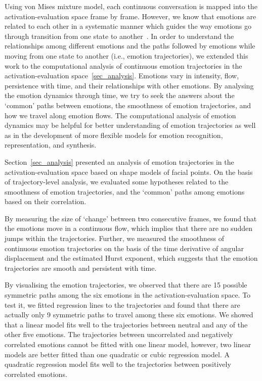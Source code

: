 \documentclass[10pt,journal,cspaper,compsoc]{IEEEtran}
\begin{document}
Using von Mises mixture model, each continuous conversation is mapped into the activation-evaluation space frame by frame. However, we know that emotions are related to each other in a systematic manner which guides the way emotions go through transition from one state to another~\cite{blumberg1991patterns}. In order to understand the relationships among different emotions and the paths followed by emotions while moving from one state to another (i.e., emotion trajectories), we extended this work to the computational analysis of continuous emotion trajectories in the activation-evaluation space~\ref{sec_analysis}. Emotions vary in intensity, flow, persistence with time, and their relationships with other emotions. By analysing the emotion dynamics through time, we try to seek the answers about the `common' paths between emotions, the smoothness of emotion trajectories, and how we travel along emotion flows. The computational analysis of emotion dynamics may be helpful for better understanding of emotion trajectories as well as in the development of more flexible models for emotion recognition, representation, and synthesis.

Section~\ref{sec_analysis} presented an analysis of emotion trajectories in the activation-evaluation space based on shape models of facial points. On the basis of trajectory-level analysis, we evaluated some hypotheses related to the smoothness of emotion trajectories, and the `common' paths among emotions based on their correlation.

By measuring the size of `change' between two consecutive frames, we found that the emotions move in a continuous flow, which implies that there are no sudden jumps within the trajectories. Further, we measured the smoothness of continuous emotion trajectories on the basis of the time derivative of angular displacement and the estimated Hurst exponent, which suggests that the emotion trajectories are smooth and persistent with time.

By visualising the emotion trajectories, we observed that there are 15 possible symmetric paths among the six emotions in the activation-evaluation space. To test it, we fitted regression lines to the trajectories and found that there are actually only 9 symmetric paths to travel among these six emotions. We showed that a linear model fits well to the trajectories between neutral and any of the other five emotions. The trajectories between uncorrelated and negatively correlated emotions cannot be fitted with one linear model, however, two linear models are better fitted than one quadratic or cubic regression model. A quadratic regression model fits well to the trajectories between positively correlated emotions. 
\end{document}
